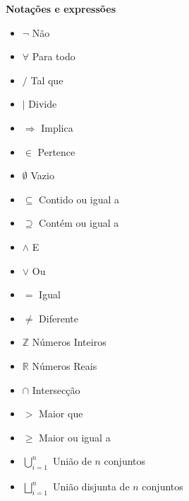 \begin{center} \textbf{\Large Nota{\c c}{\~o}es e express{\~o}es}
\end{center}
\begin{minipage}[l]{0,5\textwidth}
\begin{itemize}
\item $\neg$ N{\~a}o
\item $\forall$ Para todo
\item $/$ Tal que
\item $|$ Divide
\item $\Rightarrow$ Implica
\item $\in$ Pertence
\item $\emptyset$ Vazio
\item $\subseteq$ Contido ou igual a
\item $\supseteq$ Cont{\'e}m ou igual a
\item $\wedge$ E
\item $\vee$ Ou
\item $=$ Igual
\item $\neq$ Diferente
\item $\mathbb{Z}$ N{\'u}meros Inteiros
\item $\mathbb{R}$ N{\'u}meros Reais
\item $\cap$ Intersec{\c c}{\~a}o
\item $>$ Maior que
\item $\geq$ Maior ou igual a
\item $\displaystyle\bigcup_{i=1}^{n}$ Uni{\~a}o de $n$ conjuntos
\item $\displaystyle\bigsqcup_{i=1}^{n}$ Uni{\~a}o disjunta de $n$ conjuntos


\end{itemize}
\end{minipage}
